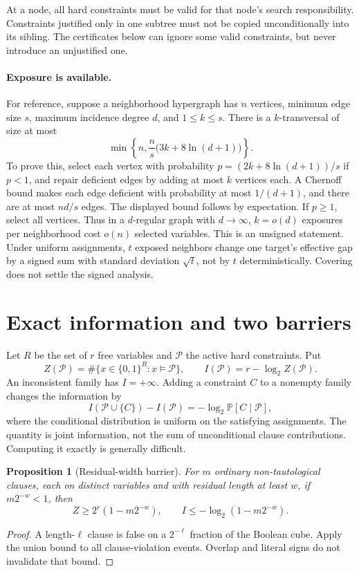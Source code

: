 \documentclass[11pt,a4paper]{article}
\newtheorem{proposition}[theorem]{Proposition}
\theoremstyle{definition}
\theoremstyle{remark}
\newcommand{\Pcal}{\mathcal P}
\newcommand{\Prb}{\mathbb P}
\begin{document}
At a node, all hard constraints must be valid for that node's search
responsibility. Constraints justified only in one subtree must not be
copied unconditionally into its sibling. The certificates below can ignore
some valid constraints, but never introduce an unjustified one.

\paragraph{Exposure is available.}
For reference, suppose a neighborhood hypergraph has $n$ vertices,
minimum edge size $s$, maximum incidence degree $d$, and $1\le k\le s$.
There is a $k$-transversal of size at most
\[
 \min\left\{n,\frac n s\bigl(3k+8\ln(d+1)\bigr)\right\}.
\]
To prove this, select each vertex with probability
$p=(2k+8\ln(d+1))/s$ if $p<1$, and repair deficient edges by adding at most
$k$ vertices each. A Chernoff bound makes each edge deficient with
probability at most $1/(d+1)$, and there are at most $nd/s$ edges.
The displayed bound follows by expectation. If $p\ge1$, select all vertices.
Thus in a $d$-regular graph with $d\to\infty$, $k=o(d)$ exposures per
neighborhood cost $o(n)$ selected variables. This is an unsigned statement.
Under uniform assignments, $t$ exposed neighbors change one target's
effective gap by a signed sum with standard deviation $\sqrt t$, not by
$t$ deterministically. Covering does not settle the signed analysis.

\section{Exact information and two barriers}

Let $R$ be the set of $r$ free variables and $\Pcal$ the active hard
constraints. Put
\[
 Z(\Pcal)=\#\{x\in\{0,1\}^R:x\models\Pcal\},\qquad
 I(\Pcal)=r-\log_2 Z(\Pcal).
\]
An inconsistent family has $I=+\infty$. Adding a constraint $C$ to a
nonempty family changes the information by
\[
 I(\Pcal\cup\{C\})-I(\Pcal)
 =-\log_2\Prb[C\mid\Pcal],
\]
where the conditional distribution is uniform on the satisfying assignments.
The quantity is joint information, not the sum of unconditional clause
contributions. Computing it exactly is generally difficult.

\begin{proposition}[Residual-width barrier]\label{prop:width}
For $m$ ordinary non-tautological clauses, each on distinct variables and
with residual length at least $w$, if $m2^{-w}<1$, then
\[
 Z\ge2^r(1-m2^{-w}),\qquad
 I\le-\log_2(1-m2^{-w}).
\]
\end{proposition}
\begin{proof}
A length-$\ell$ clause is false on a $2^{-\ell}$ fraction of the Boolean
cube. Apply the union bound to all clause-violation events. Overlap and
literal signs do not invalidate that bound.
\end{proof}
\end{document}
